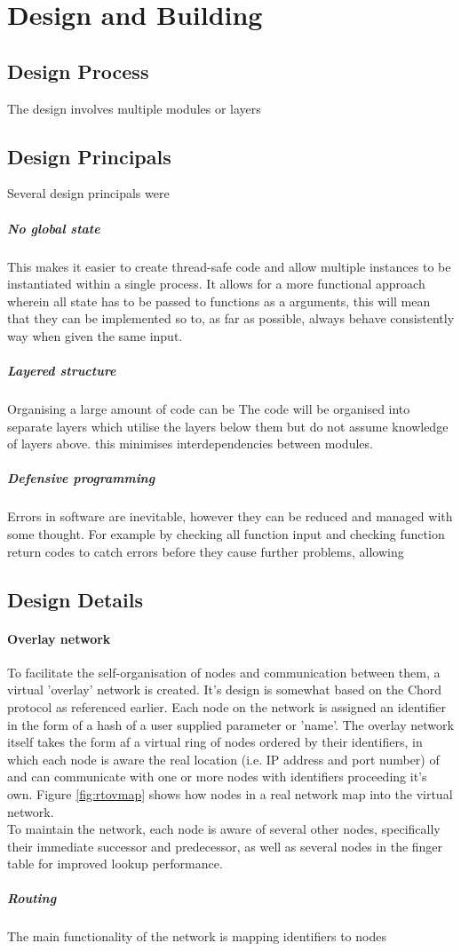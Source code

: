 \documentclass{article}
\begin{document}
\section{Design and Building}

\subsection{Design Process}

The design involves multiple modules or layers

\subsection{Design Principals}
Several design principals were

\subparagraph{No global state}
This makes it easier to create thread-safe code and allow multiple instances to be instantiated within a single process. It allows for a more functional approach wherein all state has to be passed to functions as a arguments, this will mean that they can be implemented so to, as far as possible, always behave consistently way when given the same input.

\subparagraph{Layered structure}
Organising a large amount of code can be
The code will be organised into separate layers which utilise the layers below them but do not assume knowledge of layers above. this minimises interdependencies between modules.

\subparagraph{Defensive programming}
Errors in software are inevitable, however they can be reduced and managed with some thought. For example by checking all function input and checking function return codes to catch errors before they cause further problems, allowing

\subsection{Design Details}

\paragraph{Overlay network}
To facilitate the self-organisation of nodes and communication between them, a virtual 'overlay' network is created. It's design is somewhat based on the Chord protocol as referenced earlier. Each node on the network is assigned an identifier in the form of a hash of a user supplied parameter or 'name'. The overlay network itself takes the form af a virtual ring of nodes ordered by their identifiers, in which each node is aware the real location (i.e. IP address and port number) of and can communicate with one or more nodes with identifiers proceeding it's own. Figure \ref{fig:rtovmap} shows how nodes in a real network map into the virtual network.
\\
To maintain the network, each node is aware of several other nodes, specifically their immediate successor and predecessor, as well as several nodes in the finger table for improved lookup performance.
\subparagraph{Routing} The main functionality of the network is mapping identifiers to nodes
\end{document}
